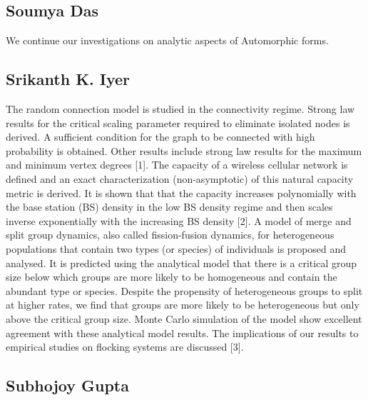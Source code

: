 \subsection{Soumya Das}

We continue our investigations on analytic aspects of Automorphic forms.


\subsection{Srikanth K. Iyer}

The random connection model is studied in the connectivity regime. Strong law results for the critical scaling parameter required to eliminate isolated nodes is derived. A sufficient condition for the graph to be connected with high probability is obtained. Other results include strong law results for the maximum and minimum vertex degrees [1]. The capacity of a wireless cellular network is defined and an exact characterization (non-asymptotic) of this natural capacity metric is derived. It is shown that that the capacity increases polynomially with the base station (BS) density in the low BS density regime and then scales inverse exponentially with the increasing BS density [2]. A model of merge and split group dynamics, also called fission-fusion dynamics, for heterogeneous populations that contain two types (or species) of individuals is proposed and analysed. It is predicted using the analytical model that there is a critical group size below which groups are more likely to be homogeneous and contain the abundant type or species. Despite the propensity of heterogeneous groups to split at higher rates, we find that groups are more likely to be heterogeneous but only above the critical group size. Monte Carlo simulation of the model show excellent agreement with these analytical model results. The implications of our results to empirical studies on flocking systems are discussed [3].


\subsection{Subhojoy Gupta}

